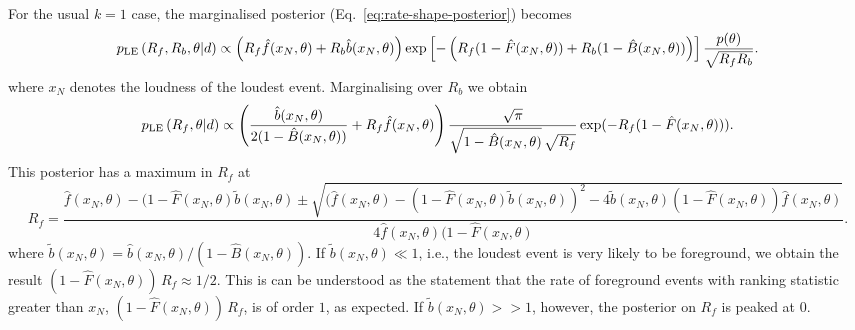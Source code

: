 \documentclass[aps,prd]{revtex4-1}
\begin{document}
For the usual $k=1$ case, the marginalised posterior
(Eq.~\eqref{eq:rate-shape-posterior}) becomes
\begin{equation}
p_{\rm LE}\left( R_f, R_b, \theta | d \right) \propto \left(R_f
\hat{f}(x_N,\theta) + R_b \hat{b}(x_N,\theta)\right)\exp\left[-\left(
  R_f (1-\hat{F}(x_N,\theta)) + R_b (1-\hat{B}(x_N,\theta)) \right)
  \right] \frac{p(\theta)}{\sqrt{R_f R_b}}.
\end{equation}
where $x_N$ denotes the loudness of the loudest event. Marginalising
over $R_b$ we obtain
\begin{equation}
p_{\rm LE}\left( R_f, \theta | d \right) \propto \left(
\frac{\hat{b}(x_N,\theta)}{2(1-\hat{B}(x_N,\theta))} + R_f
\hat{f}(x_N,\theta)\right)\frac{\sqrt{\pi}}{\sqrt{1-\hat{B}(x_N,\theta)}\,\sqrt{R_f}}
\exp(-R_f(1-\hat{F}(x_N,\theta))) .
\end{equation}
This posterior has a maximum in $R_f$ at
\begin{equation}
R_f =
\frac{\hat{f}(x_N,\theta)-(1-\hat{F}(x_N,\theta)\tilde{b}(x_N,\theta)
  \pm
  \sqrt{(\hat{f}(x_N,\theta)-(1-\hat{F}(x_N,\theta)\tilde{b}(x_N,\theta))^2
    -
    4\tilde{b}(x_N,\theta)(1-\hat{F}(x_N,\theta))\hat{f}(x_N,\theta)}}{4
  \hat{f}(x_N,\theta)(1-\hat{F}(x_N,\theta)}.
\end{equation}
where $\tilde{b}(x_N,\theta)
=\hat{b}(x_N,\theta)/(1-\hat{B}(x_N,\theta))$. If
$\tilde{b}(x_N,\theta) \ll 1$, i.e., the loudest event is very likely
to be foreground, we obtain the result $(1- \hat{F}(x_N,\theta))\,R_f
\approx 1/2$. This is can be understood as the statement that the rate
of foreground events with ranking statistic greater than $x_N$, $(1-
\hat{F}(x_N,\theta))\,R_f$, is of order $1$, as expected. If
$\tilde{b}(x_N,\theta) >> 1$, however, the posterior on $R_f$ is
peaked at $0$.
\end{document}

